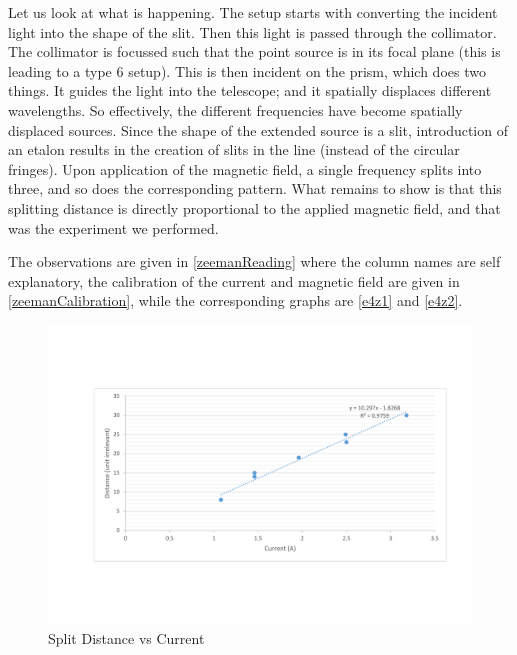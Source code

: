 Let us look at what is happening. The setup starts with converting
the incident light into the shape of the slit. Then this light is
passed through the collimator. The collimator is focussed such that
the point source is in its focal plane (this is leading to a type
6 setup). This is then incident on the prism, which does two things.
It guides the light into the telescope; and it spatially displaces
different wavelengths. So effectively, the different frequencies have
become spatially displaced sources. Since the shape of the extended
source is a slit, introduction of an etalon results in the creation
of slits in the line (instead of the circular fringes). Upon application
of the magnetic field, a single frequency splits into three, and so
does the corresponding pattern. What remains to show is that this
splitting distance is directly proportional to the applied magnetic
field, and that was the experiment we performed.

The observations are given in \autoref{zeemanReading} where the column names are self explanatory, the calibration of the current and magnetic field are given in \autoref{zeemanCalibration}, while the corresponding graphs are \autoref{e4z1} and \autoref{e4z2}.
\label{zeemanReading}
\label{zeemanCalibration}

\begin{figure}[bth]
	\begin{center}
		\includegraphics[width=1.3\linewidth]{gfx/4_zeeman}
	\end{center}
\caption[Split Distance vs Current]{Split Distance vs Current}
\label{e4z1}
\end{figure}

